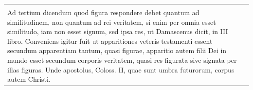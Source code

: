 \documentclass[paper=a4paper,fontsize=10pt,jafontsize=9pt,titlepage]{jlreq}
\begin{document}
\begin{longtable}{p{21em}p{21em}}
&


\\



Ad tertium dicendum quod figura respondere debet quantum ad
similitudinem, non quantum ad rei veritatem, si enim per omnia esset
similitudo, iam non esset signum, sed ipsa res, ut Damascenus dicit, in
III libro. Conveniens igitur fuit ut apparitiones veteris testamenti
essent secundum apparentiam tantum, quasi figurae, apparitio autem filii
Dei in mundo esset secundum corporis veritatem, quasi res figurata sive
signata per illas figuras. Unde apostolus, Coloss. II, quae sunt umbra
futurorum, corpus autem Christi.


&





\end{longtable}
\newpage
\end{document}
